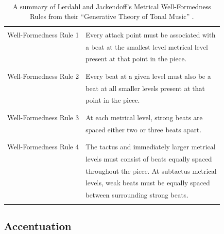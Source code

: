 \begin{table}
\begin{tabular}{|l|l|}\hline %
& \\
Well-Formedness Rule 1 & Every attack point must be associated with \\
                       & a beat at the smallest level metrical level \\
                       & present at that point in the piece. \\
                       & \\ \hline
                       & \\

Well-Formedness Rule 2 & Every beat at a given level must also be a \\
                       & beat at all smaller levels present at that \\
                       & point in the piece. \\
                       & \\ \hline
                       & \\

Well-Formedness Rule 3 & At each metrical level, strong beats are \\ 
                       & spaced either two or three beats apart. \\
                       & \\ \hline
                       &  \\

Well-Formedness Rule 4 & The tactus and immediately larger metrical \\
                       & levels must consist of beats equally spaced \\
                       & throughout the piece. At subtactus metrical  \\ 
                       & levels, weak beats must be equally spaced \\
                       & between surrounding strong beats. \\
                       & \\ \hline
\end{tabular}
\caption {A summary of Lerdahl and Jackendoff's Metrical Well-Formedness
  Rules from their ``Generative Theory of Tonal Music'' \cite{Lerdahl:83}.}
\end{table}

\vspace{5mm}
\subsection{Accentuation}

